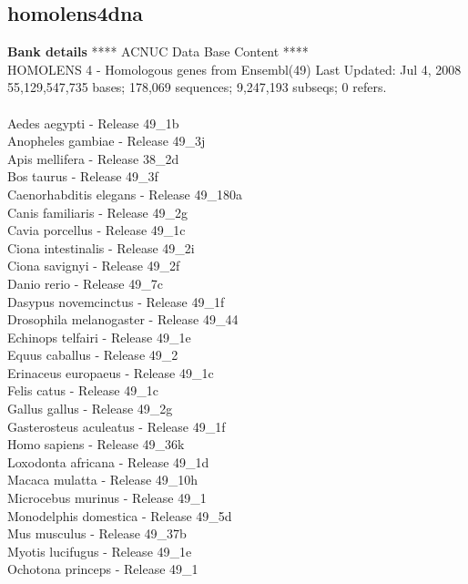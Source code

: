 \documentclass{article}
\begin{document}
\begin{Schunk}
\section{ homolens4dna }
\textbf{Bank details}
             ****     ACNUC Data Base Content      ****\\
         HOMOLENS 4 - Homologous genes from Ensembl(49)	Last Updated: Jul  4, 2008\\
55,129,547,735 bases; 178,069 sequences; 9,247,193 subseqs; 0 refers.\\
\\
 Aedes aegypti - Release 49\_1b \\
 Anopheles gambiae - Release 49\_3j \\
 Apis mellifera - Release 38\_2d \\
 Bos taurus - Release 49\_3f \\
 Caenorhabditis elegans - Release 49\_180a \\
 Canis familiaris - Release 49\_2g \\
 Cavia porcellus - Release 49\_1c \\
 Ciona intestinalis - Release 49\_2i \\
 Ciona savignyi - Release 49\_2f \\
 Danio rerio - Release 49\_7c \\
 Dasypus novemcinctus - Release 49\_1f \\
 Drosophila melanogaster - Release 49\_44 \\
 Echinops telfairi - Release 49\_1e \\
 Equus caballus - Release 49\_2 \\
 Erinaceus europaeus - Release 49\_1c \\
 Felis catus - Release 49\_1c \\
 Gallus gallus - Release 49\_2g \\
 Gasterosteus aculeatus - Release 49\_1f \\
 Homo sapiens - Release 49\_36k \\
 Loxodonta africana - Release 49\_1d \\
 Macaca mulatta - Release 49\_10h \\
 Microcebus murinus - Release 49\_1 \\
 Monodelphis domestica - Release 49\_5d \\
 Mus musculus - Release 49\_37b \\
 Myotis lucifugus - Release 49\_1e \\
 Ochotona princeps - Release 49\_1 \\

\end{Schunk}
\end{document}
